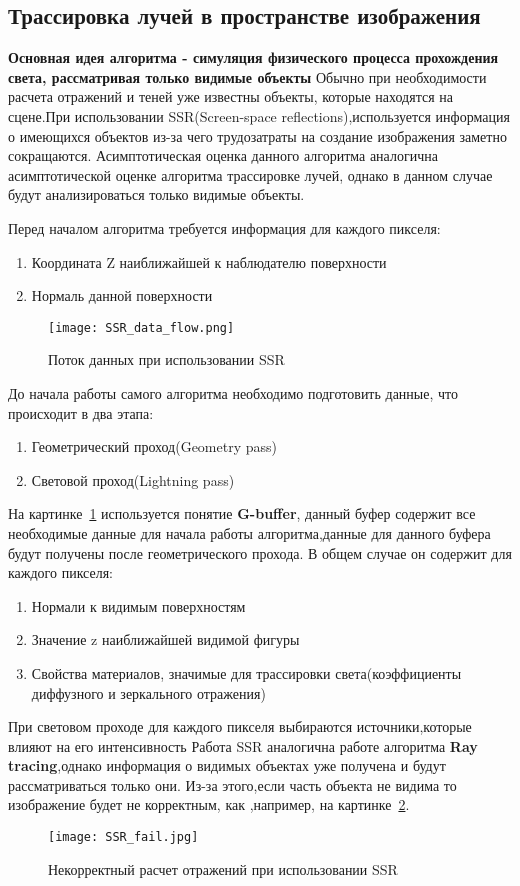 \subsection{Трассировка лучей в пространстве изображения}
\textbf{Основная идея алгоритма - симуляция физического процесса прохождения света, рассматривая только видимые объекты} \newline
Обычно при необходимости расчета отражений и теней уже известны объекты, которые находятся на сцене.При использовании SSR(Screen-space reflections),используется информация о имеющихся
объектов из-за чего трудозатраты на создание изображения заметно сокращаются.
Асимптотическая оценка данного алгоритма аналогична асимптотической оценке алгоритма трассировке лучей, однако в данном случае будут анализироваться только видимые объекты.\cite{SSR}

Перед началом алгоритма требуется информация для каждого пикселя:
\begin{enumerate}
	\item Координата Z наиближайшей к наблюдателю поверхности
	\item Нормаль данной поверхности
\end{enumerate}

\begin{figure}[H]
	\centering
	\texttt{[image: SSR\_data\_flow.png]}
	\caption{Поток данных при использовании SSR}
	\label{fig:SSR_data_flow}
\end{figure} 

До начала работы самого алгоритма необходимо подготовить данные, что происходит в два этапа:
\begin{enumerate}
	\item Геометрический проход(Geometry pass)
	\item Световой проход(Lightning pass)
\end{enumerate}

На картинке~\ref{fig:SSR_data_flow} используется понятие \textbf{G-buffer}, данный буфер содержит все необходимые данные для начала работы алгоритма,данные для данного буфера
будут получены после геометрического прохода. В общем случае он содержит для каждого пикселя:
\begin{enumerate}
	\item Нормали к видимым поверхностям
	\item Значение z наиближайшей видимой фигуры
	\item Свойства материалов, значимые для трассировки света(коэффициенты диффузного и зеркального отражения)
\end{enumerate}
При световом проходе для каждого пикселя выбираются источники,которые влияют на его интенсивность
Работа SSR аналогична работе алгоритма \textbf{Ray tracing},однако информация о видимых объектах уже получена и будут рассматриваться только они.
Из-за этого,если часть объекта не видима то изображение будет не корректным, как ,например, на картинке~\ref{fig:SSR_fail}.\cite{SSR,reflexion_types}
\begin{figure}[H]
	\centering
	\texttt{[image: SSR\_fail.jpg]}
	\caption{Некорректный расчет отражений при использовании SSR}
	\label{fig:SSR_fail}
\end{figure} 

